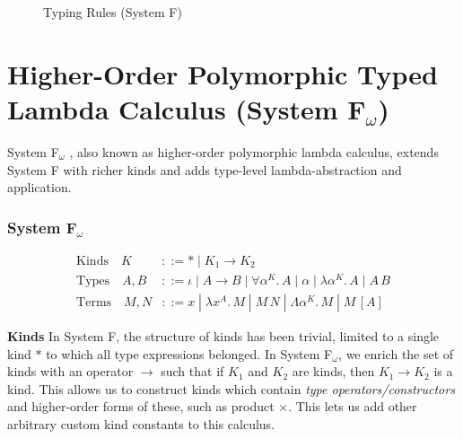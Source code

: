 \documentclass[acmsmall, 9pt]{article}
\begin{document}
\begin{figure}[H]
\flushleft {}
\caption{Typing Rules (System F)}
\end{figure}


\section{Higher-Order Polymorphic Typed Lambda Calculus (System F$_\omega$)}
System F$_\omega$ \cite{cambridge-lambda-calc, pierce2002types}, also known as higher-order polymorphic lambda calculus, extends System F with richer kinds and adds type-level lambda-abstraction and application.


\subsubsection{System F$_\omega$}
\begin{align*}
  \text{Kinds} \quad K &::= * \; | \; K_1 \rightarrow K_2\\
  \text{Types} \quad  A, B &::= \iota \; | \;  A \rightarrow B \; | \; \forall \alpha^K . \, A\; | \; \alpha \; | \; \lambda \alpha^K. \, A \; | \; A \, B\\
  \text{Terms} \quad M, N &::= x \; | \; \lambda x^A . \, M \; | \; M \, N  \; | \; \Lambda \alpha^K . \, M \; | \; M \, [A]
\end{align*}


\textbf{Kinds} In System F, the structure of kinds has been trivial, limited to a single kind $*$ to which all type expressions belonged. In System F$_\omega$, we enrich the set of kinds with an operator $\rightarrow$ such that if $K_1$ and $K_2$ are kinds, then $K_1 \rightarrow K_2$ is a kind. This allows us to construct kinds which contain \textit{type operators/constructors} and higher-order forms of these, such as product $\times$. This lets us add other arbitrary custom kind constants to this calculus.
\end{document}
